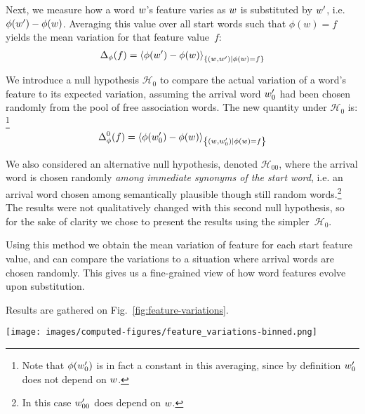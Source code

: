 Next, we measure how a word $w$'s feature varies as $w$ is substituted by $w'$, i.e. $\phi(w') - \phi(w)$.
Averaging this value over all start words such that $\phi(w) = f$ yields the mean variation for that feature value~$f$:
$$\Delta_{\phi}(f) = \left< \phi(w') - \phi(w) \right>_{\left\lbrace (w,w') | \phi(w) = f \right\rbrace}$$

We introduce a null hypothesis $\mathcal{H}_0$ to compare the actual variation of a word's feature to its expected variation, assuming the arrival word $w'_0$ had been chosen randomly from the pool of free association words.
The new quantity under $\mathcal{H}_0$ is:
\footnote{Note that $\phi(w'_0)$ is in fact a constant in this averaging, since by definition $w'_0$ does not depend on $w$.}
$$\Delta_{\phi}^0 (f) = \left< \phi({w'_0}) - \phi(w) \right>_{\left\lbrace (w,w'_0) | \phi(w) = f \right\rbrace}$$

We also considered an alternative null hypothesis, denoted $\mathcal{H}_{00}$, where the arrival word is chosen randomly \emph{among immediate synonyms of the start word}, i.e. an arrival word chosen among semantically plausible though still random words.\footnote{In this case $w'_{00}$ does depend on $w$.}
The results were not qualitatively changed with this second null hypothesis, so for the sake of clarity we chose to present the results using the simpler~$\mathcal{H}_0$.

Using this method we obtain the mean variation of feature for each start feature value, and can compare the variations to a situation where arrival words are chosen randomly.
This gives us a fine-grained view of how word features evolve upon substitution.


\medskip
Results are gathered on Fig.~\ref{fig:feature-variations}.


\begin{figure*}[!th]
    \centering
    \texttt{[image: images/computed-figures/feature\_variations-binned.png]}
    \caption{\textbf{Feature variation upon substitution:} average feature of the appearing word minus $\mathcal{H}_0$ vs. average feature of the disappearing word in a substitution, with 95\% asymptotic confidence intervals.
    The overall position of the curve with respect to $y = 0$ indicates the direction of the cognitive bias.
    The fact that all the curves have slopes smaller than 1 means that the substitution operation is contractile on average: each feature will converge towards its own specific asymptotic range, which is consistent with the evolution observed in Figure~\ref{fig:timebags-evolution}.}
    \label{fig:feature-variations}
\end{figure*}